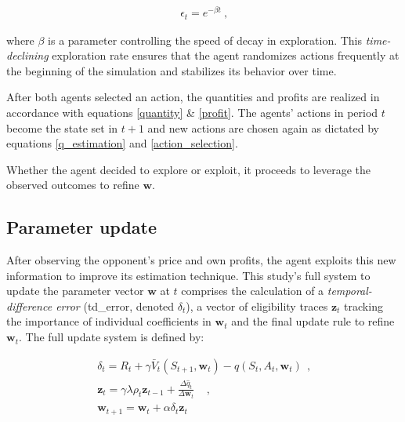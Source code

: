 \begin{gather}
	\epsilon_t = e^{-\beta t}~ \text{,}
\end{gather}

where $\beta$ is a parameter controlling the speed of decay in exploration. This \emph{time-declining} exploration rate ensures that the agent randomizes actions frequently at the beginning of the simulation and stabilizes its behavior over time. 

After both agents selected an action, the quantities and profits are realized in accordance with equations \ref{quantity} \& \ref{profit}. The agents' actions in period $t$ become the state set in $t+1$ and new actions are chosen again as dictated by equations \ref{q_estimation} and \ref{action_selection}.

Whether the agent decided to explore or exploit, it proceeds to leverage the observed outcomes to refine $\boldsymbol{w}$.

\subsection{Parameter update}\label{parameter_update}

After observing the opponent's price and own profits, the agent exploits this new information to improve its estimation technique. This study's full system to update the parameter vector $\boldsymbol{w}$ at $t$ comprises the calculation of a \emph{temporal-difference error} (\gls{td_error}, denoted $\delta_t$), a vector of eligibility traces $\boldsymbol{z}_t$ tracking the importance of individual coefficients in $\boldsymbol{w}_t$ and the final update rule to refine $\boldsymbol{w}_t$. The full update system is defined by:

\begin{gather}
\delta_t = R_t + \gamma \bar{V}_t(S_{t+1}, \boldsymbol{w}_t) - \hat{q}(S_t, A_t, \boldsymbol{w}_t) ~~ \text{,} \label{td_error_expected} \\
\boldsymbol{z}_{t} = 
\gamma \lambda \rho_t \boldsymbol{z}_{t-1} + \frac{\Delta \hat{q}_t}{\Delta \boldsymbol{w}_t} ~~~~~ \text{,} \label{eligibility_trace_update} \\
\boldsymbol{w}_{t+1} = \boldsymbol{w}_t + \alpha \delta_t	\boldsymbol{z}_t \label{update_rule}
\end{gather}

